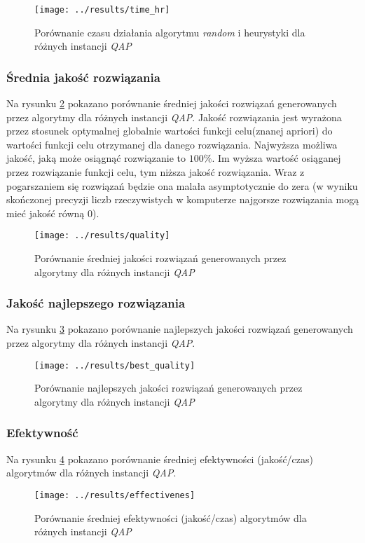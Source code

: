 \documentclass{article}
\begin{document}
			\begin{figure}[h]
				\texttt{[image: ../results/time\_hr]}
				\caption{Porównanie czasu działania algorytmu \emph{random} i heurystyki dla różnych instancji \emph{QAP}\label{fig:time_hr}}
			\end{figure}

		\subsubsection{Średnia jakość rozwiązania}Na rysunku \ref{fig:quality} pokazano porównanie średniej jakości rozwiązań generowanych przez algorytmy dla różnych instancji \emph{QAP}. Jakość rozwiązania jest wyrażona przez stosunek optymalnej globalnie wartości funkcji celu(znanej apriori) do wartości funkcji celu otrzymanej dla danego rozwiązania. Najwyższa możliwa jakość, jaką może osiągnąć rozwiązanie to $100\%$. Im wyższa wartość osiąganej przez rozwiązanie funkcji celu, tym niższa jakość rozwiązania. Wraz z pogarszaniem się rozwiązań będzie ona malała asymptotycznie do zera (w wyniku skończonej precyzji liczb rzeczywistych w komputerze najgorsze rozwiązania mogą mieć jakość równą 0).
			\begin{figure}[h]
				\texttt{[image: ../results/quality]}
				\caption{Porównanie średniej jakości rozwiązań generowanych przez algorytmy dla różnych instancji \emph{QAP}\label{fig:quality}}
			\end{figure}

		\subsubsection{Jakość najlepszego rozwiązania}Na rysunku \ref{fig:best_quality} pokazano porównanie najlepszych jakości rozwiązań generowanych przez algorytmy dla różnych instancji \emph{QAP}.
		 	\begin{figure}[h]
				\texttt{[image: ../results/best\_quality]}
				\caption{Porównanie najlepszych jakości rozwiązań generowanych przez algorytmy dla różnych instancji \emph{QAP}\label{fig:best_quality}}
			\end{figure}

		\subsubsection{Efektywność}Na rysunku \ref{fig:effectivenes} pokazano porównanie średniej efektywności (jakość/czas) algorytmów dla różnych instancji \emph{QAP}.
			\begin{figure}[h]
				\texttt{[image: ../results/effectivenes]}
				\caption{Porównanie średniej efektywności (jakość/czas) algorytmów dla różnych instancji \emph{QAP}\label{fig:effectivenes}}
			\end{figure}
\end{document}
